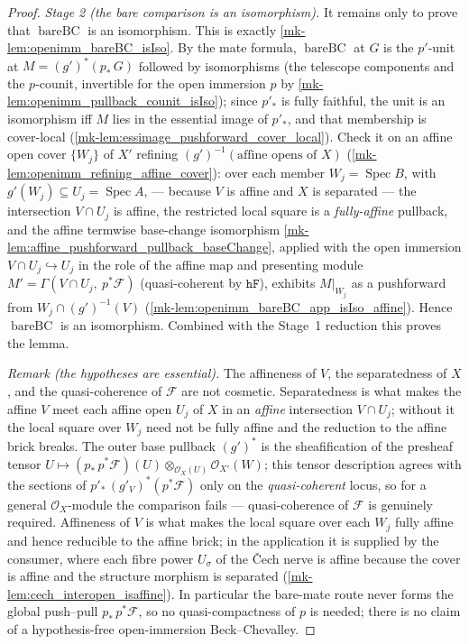 \begin{proof}
  \emph{Stage 2 (the bare comparison is an isomorphism).} It remains only to prove that
  \(\operatorname{bareBC}\) is an isomorphism. This is exactly \ref{mk-lem:openimm_bareBC_isIso}.
  By the mate formula, \(\operatorname{bareBC}\) at \(G\) is the \(p'\)-unit at
  \(M = (g')^*(p_*\,G)\) followed by isomorphisms (the telescope components and the \(p\)-counit,
  invertible for the open immersion \(p\) by \ref{mk-lem:openimm_pullback_counit_isIso}); since
  \(p'_*\) is fully faithful, the unit is an isomorphism iff \(M\) lies in the essential image of
  \(p'_*\), and that membership is cover-local (\ref{mk-lem:essimage_pushforward_cover_local}).
  Check it on an affine open cover \(\{W_j\}\) of \(X'\) refining
  \((g')^{-1}(\text{affine opens of } X)\) (\ref{mk-lem:openimm_refining_affine_cover}): over each
  member \(W_j = \operatorname{Spec} B\), with \(g'(W_j) \subseteq U_j = \operatorname{Spec} A\),
  --- because \(V\) is affine and \(X\) is separated --- the intersection \(V \cap U_j\) is
  affine, the restricted local square is a \emph{fully-affine} pullback, and the
  affine termwise base-change isomorphism \ref{mk-lem:affine_pushforward_pullback_baseChange},
  applied with the open immersion \(V \cap U_j \hookrightarrow U_j\) in the role of the affine
  map and presenting module \(M' = \Gamma(V \cap U_j,\ p^*\mathcal{F})\) (quasi-coherent by
  \(\mathtt{hF}\)), exhibits \(M|_{W_j}\) as a pushforward from \(W_j \cap (g')^{-1}(V)\)
  (\ref{mk-lem:openimm_bareBC_app_isIso_affine}). Hence \(\operatorname{bareBC}\) is an
  isomorphism. Combined with the Stage~1 reduction this proves the lemma.

  \emph{Remark (the hypotheses are essential).} The affineness of \(V\), the separatedness of
  \(X\), and the quasi-coherence of \(\mathcal{F}\) are not cosmetic. Separatedness is what makes
  the affine \(V\) meet each affine open \(U_j\) of \(X\) in an \emph{affine} intersection
  \(V \cap U_j\); without it the local square over \(W_j\) need not be fully affine and the
  reduction to the affine brick breaks. The outer base pullback \((g')^*\) is the sheafification
  of the presheaf tensor \(U \mapsto (p_*\,p^*\mathcal{F})(U) \otimes_{\mathcal{O}_X(U)}
  \mathcal{O}_{X'}(W)\); this tensor description agrees with the sections of
  \(p'_*\,(g'_V)^*(p^*\mathcal{F})\) only on the \emph{quasi-coherent} locus, so for a general
  \(\mathcal{O}_X\)-module the comparison fails --- quasi-coherence of \(\mathcal{F}\) is genuinely
  required. Affineness of \(V\) is what makes the local square over each \(W_j\) fully affine and
  hence reducible to the affine brick; in the application it is supplied by the consumer, where
  each fibre power \(U_\sigma\) of the {\v C}ech nerve is affine because the cover is affine and
  the structure morphism is separated (\ref{mk-lem:cech_interopen_isaffine}). In particular the
  bare-mate route never forms the global push--pull \(p_*\,p^*\mathcal{F}\), so no
  quasi-compactness of \(p\) is needed; there is no claim of a hypothesis-free open-immersion
  Beck--Chevalley.
\end{proof}

